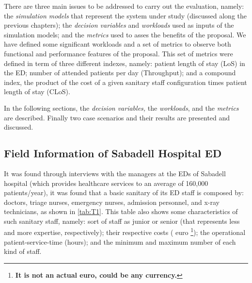 \documentclass[11pt]{article} %
\begin{document}
There are three main issues to be addressed to carry out the evaluation,
namely: the \textit{simulation models} that represent the system under
study (discussed along the previous chapters); the \textit{decision
variables} and\textit{ workloads} used as inputs of the simulation
models; and the \textit{metrics} used to asses the benefits of the
proposal. We have defined some significant workloads and a set of
metrics to observe both functional and performance features of the
proposal. This set of metrics were defined in term of three different
indexes, namely: patient length of stay (LoS) in the ED; number of
attended patients per day (Throughput); and a compound index, the
product of the cost of a given sanitary staff configuration times
patient length of stay (CLoS).

In the following sections, the \textit{decision variables, }the\textit{
workloads}, and the \textit{metrics} are described. Finally two case
scenarios and their results are presented and discussed. 


\subsection{Field Information of Sabadell Hospital ED}
\label{ssec:sabadell}

It was found through interviews with the managers at the EDs of Sabadell
hospital (which provides healthcare services to an average of 160,000
patients/year), it was found that a basic sanitary of its ED staff
is composed by: doctors, triage nurses, emergency nurses, admission
personnel, and x-ray technicians, as shown in \ref{tab:T1}. This
table also shows some characteristics of such sanitary staff, namely:
sort of staff as junior or senior (that represents less and more expertise,
respectively); their respective costs ( euro \textbf{}%
\footnote{\textbf{It is not an actual euro, could be any currency.\label{fn:euro}}%
}); the operational patient-service-time (hours); and the minimum and
maximum number of each kind of staff. 
\end{document}
